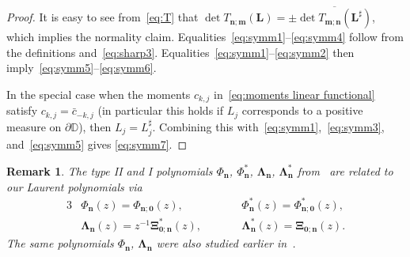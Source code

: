 \documentclass[reqno,centertags,11pt,draft]{amsart}
\newtheorem{rem}[thm]{Remark}
\newcommand{\Z}{\mathbb{Z}}
\newcommand{\T}{\mathbb{\partial\mathbb{D}}}
\begin{document}
\begin{proof}
    It is easy to see from~\eqref{eq:T} that $\det T_{\bm{n};\bm{m}}(\bm{L}) = \pm \overline{\det T_{\bm{m};\bm{n}}(\bm{L}^\sharp)}$, which implies the normality claim.  
    Equalities~\eqref{eq:symm1}--\eqref{eq:symm4} follow from the definitions and~\eqref{eq:sharp3}.
    Equalities~\eqref{eq:symm1}--\eqref{eq:symm2} then imply~\eqref{eq:symm5}--\eqref{eq:symm6}. 

    In the special case when the moments $c_{k,j}$ in~\eqref{eq:moments linear functional} satisfy $c_{k,j} = \bar{c}_{-k,j}$ (in particular this holds if $L_j$ corresponds to a positive measure on $\T$), then $L_j = L_j^\sharp$. Combining this with~\eqref{eq:symm1},~\eqref{eq:symm3}, and~\eqref{eq:symm5} gives \eqref{eq:symm7}.
\end{proof}
\begin{rem}\label{rem:annoying1}
    The type II and I polynomials  $\Phi_{\bm{n}}$, $\Phi_{\bm{n}}^*$, $\bm{\Lambda}_{\bm{n}}$, $\bm{\Lambda}_{\bm{n}}^*$ from~\cite{KVMOPUC}  are  related to our Laurent polynomials via
\begin{alignat}{3}
    \label{eq:mopucII}
    &\Phi_{\bm{n}}(z) = \Phi_{\bm{n};\bm{0}}(z),\qquad &&  \Phi_{\bm{n}}^*(z) = \Phi^*_{\bm{n};\bm{0}}(z), \\ 
    \label{eq:mopucI}
    &\bm{\Lambda}_{\bm{n}}(z) = z^{-1} \bm{\Xi}^*_{\bm{0};\bm{n}}(z), \qquad &&  \bm{\Lambda}_{\bm{n}}^*(z) = \bm{\Xi}_{\bm{0};\bm{n}}(z).
\end{alignat}
    The same polynomials $\Phi_{\bm{n}}$, $\bm{\Lambda}_{\bm{n}}$  were also studied earlier in~\cite{MOPUC1,MOPUC2}.
\end{rem}
\end{document}

